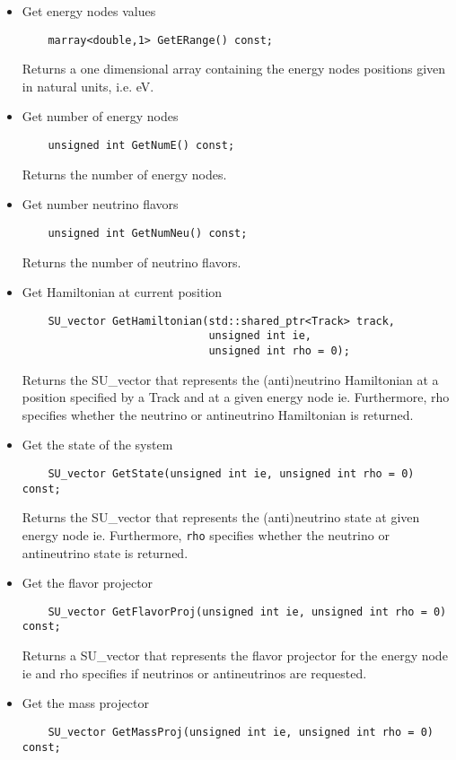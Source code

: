 \begin{itemize}
\item Get energy nodes values
  \begin{lstlisting}
    marray<double,1> GetERange() const;
  \end{lstlisting}
  Returns a one dimensional array containing the energy nodes positions given in natural units, i.e. eV.
  \item Get number of energy nodes
  \begin{lstlisting}
    unsigned int GetNumE() const;
  \end{lstlisting}
  Returns the number of energy nodes.
  \item Get number neutrino flavors
  \begin{lstlisting}
    unsigned int GetNumNeu() const;
  \end{lstlisting}
  Returns the number of neutrino flavors.
  \item Get Hamiltonian at current position
  \begin{lstlisting}
    SU_vector GetHamiltonian(std::shared_ptr<Track> track,
                             unsigned int ie, 
                             unsigned int rho = 0);
  \end{lstlisting}
  Returns the {\ttf SU\_vector} that represents the (anti)neutrino Hamiltonian at a position
  specified by a {\ttf Track} and at a given energy node {\ttf ie}. Furthermore, {\ttf rho} 
  specifies whether the neutrino or antineutrino Hamiltonian is returned.
  \item Get the state of the system 
  \begin{lstlisting}
    SU_vector GetState(unsigned int ie, unsigned int rho = 0) const;
  \end{lstlisting}
  Returns the {\ttf SU\_vector} that represents the (anti)neutrino state at given energy node {\ttf ie}. 
  Furthermore, {\tt rho} specifies whether the neutrino or antineutrino state is returned.
  \item Get the flavor projector
  \begin{lstlisting}
    SU_vector GetFlavorProj(unsigned int ie, unsigned int rho = 0) const;
  \end{lstlisting}
  Returns a {\ttf SU\_vector} that represents the flavor projector for the energy node {\ttf ie} and 
  {\ttf rho} specifies if neutrinos or antineutrinos are requested.
  \item Get the mass projector
  \begin{lstlisting}
    SU_vector GetMassProj(unsigned int ie, unsigned int rho = 0) const;

\end{lstlisting}
\end{itemize}
